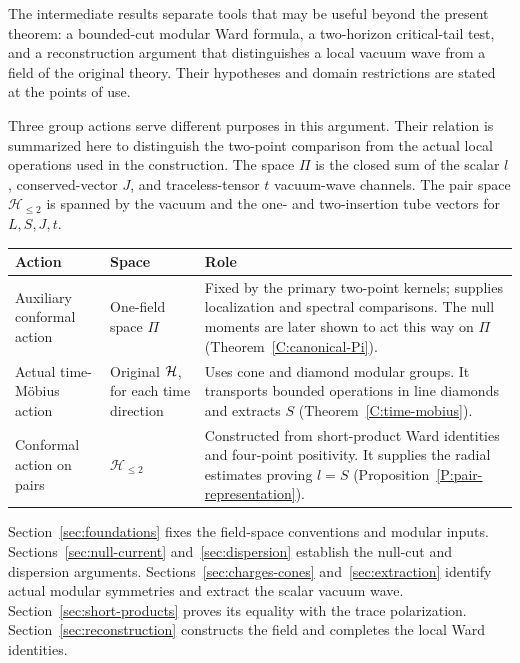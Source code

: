 The intermediate results separate tools that may be useful beyond the present theorem: a bounded-cut modular Ward formula, a two-horizon critical-tail test, and a reconstruction argument that distinguishes a local vacuum wave from a field of the original theory. Their hypotheses and domain restrictions are stated at the points of use.

Three group actions serve different purposes in this argument. Their
relation is summarized here to distinguish the two-point comparison
from the actual local operations used in the construction. The space
$\Pi$ is the closed sum of the scalar $l$, conserved-vector $J$, and
traceless-tensor $t$ vacuum-wave channels. The pair space
$\mathcal H_{\leq2}$ is spanned by the vacuum and the one- and
two-insertion tube vectors for $L,S,J,t$.
\begin{center}
\small
\begin{tabular}{@{}p{}p{}p{}@{}}
\toprule
Action & Space & Role\\
\midrule
Auxiliary conformal action & One-field space $\Pi$ &
Fixed by the primary two-point kernels; supplies localization and
spectral comparisons. The null moments are later shown to act this
way on $\Pi$ (Theorem~\ref{C:canonical-Pi}).\\[4pt]
Actual time-M\"obius action & Original $\mathcal H$, for each time direction &
Uses cone and diamond modular groups. It transports bounded
operations in line diamonds and extracts $S$
(Theorem~\ref{C:time-mobius}).\\[4pt]
Conformal action on pairs & $\mathcal H_{\leq2}$ &
Constructed from short-product Ward identities and four-point
positivity. It supplies the radial estimates proving $l=S$
(Proposition~\ref{P:pair-representation}).\\
\bottomrule
\end{tabular}
\end{center}

Section~\ref{sec:foundations} fixes the field-space conventions and
modular inputs. Sections~\ref{sec:null-current} and~\ref{sec:dispersion}
establish the null-cut and dispersion arguments.
Sections~\ref{sec:charges-cones} and~\ref{sec:extraction} identify actual
modular symmetries and extract the scalar vacuum wave.
Section~\ref{sec:short-products} proves its equality with the trace
polarization. Section~\ref{sec:reconstruction} constructs the field and
completes the local Ward identities.

